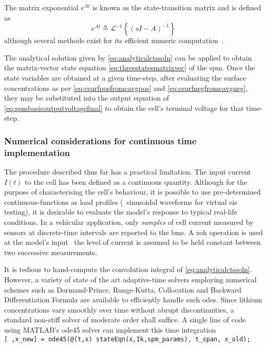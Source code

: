 The matrix exponential $e^{At}$ is known as the state-transition matrix and is
defined as
\begin{equation}
    e^{A t} ≜ \mathcal{L}^{-1}\left\{(s I - A)^{-1}\right\}
\end{equation}
although several methods exist for its efficient numeric
computation~\cite{Moler2003}.

The analytical solution  given by \cref{eq:analyticalctssoln} can  be applied to
obtain the  matrix-vector state  equation \cref{eq:threestatesmatrixvec}  of the
\gls{spm}. Once  the state variables  are obtained  at a given  time-step, after
evaluating the  surface concentrations as per  \cref{eq:csurfposfromcavgpos} and
\cref{eq:csurfnegfromcavgneg}, they may be  substituted into the output equation
of \cref{eq:spmbasicoutputvoltagefinal}  to obtain  the cell's  terminal voltage
for that time-step.

\subsubsection*{Numerical considerations for continuous time implementation}

The procedure described  thus far has a practical limitation.  The input current
$I(t)$  to the  cell has  been defined  as a  continuous quantity.  Although for
the  purpose of  characterising  the cell's  behaviour, it  is  possible to  use
pre-determined continuous-functions  as load profiles  (\eg~sinusoidal waveforms
for virtual \gls{eis} testing), it is desirable to evaluate the model's response
to typical real-life conditions. In a vehicular application, only \emph{samples}
of cell current  measured by sensors at discrete-time intervals  are reported to
the \gls{bms}. A \gls{zoh} operation is  used at the model's input \ie~the level
of current is assumed to be held constant between two successive measurements.


It    is    tedious    to    hand-compute   the    convolution    integral    of
\cref{eq:analyticalctssoln}.   However,  a   variety   of  state   of  the   art
adaptive-time  solvers  employing  numerical  schemes  such  as  Dormand-Prince,
Runge-Kutta,  Collocation and  Backward  Differentiation  Formula are  available
to  efficiently  handle  such  \glspl{ode}. Since  lithium  concentrations  vary
smoothly  over  time  without   abrupt  discontinuities,  a  standard  non-stiff
solver  of  moderate   order  shall  suffice.  A  single  line   of  code  using
\textsc{MATLAB}'s  ode45  solver  can  implement this  time  integration  \eg~\\
\texttt{[~,x_new] =  ode45(@(t,x) stateEqn(x,Ik,spm_params), t_span,
x_old); }

